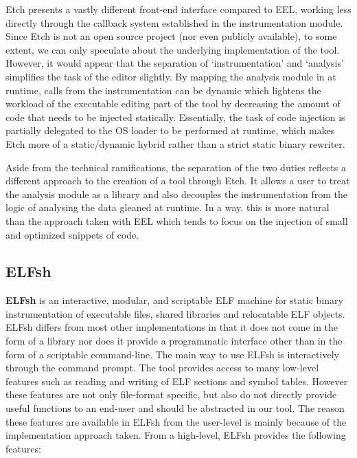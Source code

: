Etch presents a vastly different front-end interface compared to EEL, working less directly through the callback system established in the instrumentation module. Since Etch is not an open source project (nor even publicly available), to some extent, we can only speculate about the underlying implementation of the tool. However, it would appear that the separation of `instrumentation' and `analysis' simplifies the task of the editor slightly. By mapping the analysis module in at runtime, calls from the instrumentation can be dynamic which lightens the workload of the executable editing part of the tool by decreasing the amount of code that needs to be injected statically. Essentially, the task of code injection is partially delegated to the OS loader to be performed at runtime, which makes Etch more of a static/dynamic hybrid rather than a strict static binary rewriter.

Aside from the technical ramifications, the separation of the two duties reflects a different approach to the creation of a tool through Etch. It allows a user to treat the analysis module as a library and also decouples the instrumentation from the logic of analysing the data gleaned at runtime. In a way, this is more natural than the approach taken with EEL which tends to focus on the injection of small and optimized snippets of code.

\subsection{ELFsh}

\textbf{ELFsh} is an interactive, modular, and scriptable ELF machine for static binary instrumentation of executable files, shared libraries and relocatable ELF objects\cite{elfsh}. ELFsh differs from most other implementations in that it does not come in the form of a library nor does it provide a programmatic interface other than in the form of a scriptable command-line. The main way to use ELFsh is interactively through the command prompt. The tool provides access to many low-level features such as reading and writing of ELF sections and symbol tables. However these features are not only file-format specific, but also do not directly provide useful functions to an end-user and should be abstracted in our tool. The reason these features are available in ELFsh from the user-level is mainly because of the implementation approach taken. From a high-level, ELFsh provides the following features:

